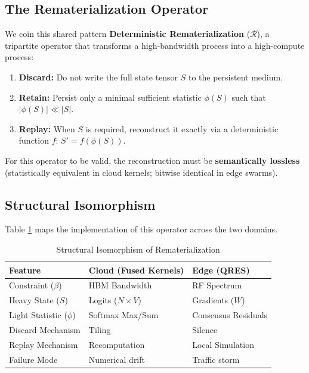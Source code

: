 \documentclass[conference]{IEEEtran}
\begin{document}
\subsection{The Rematerialization Operator}
We coin this shared pattern \textbf{Deterministic Rematerialization} ($\mathcal{R}$), a tripartite operator that transforms a high-bandwidth process into a high-compute process:
\begin{enumerate}
    \item \textbf{Discard:} Do not write the full state tensor $S$ to the persistent medium.
    \item \textbf{Retain:} Persist only a minimal sufficient statistic $\phi(S)$ such that $|\phi(S)| \ll |S|$.
    \item \textbf{Replay:} When $S$ is required, reconstruct it exactly via a deterministic function $f$: $S' = f(\phi(S))$.
\end{enumerate}

For this operator to be valid, the reconstruction must be \textbf{semantically lossless} (statistically equivalent in cloud kernels; bitwise identical in edge swarms).

\subsection{Structural Isomorphism}
Table \ref{tab:iso} maps the implementation of this operator across the two domains.

\begin{table}[htbp]
\caption{Structural Isomorphism of Rematerialization}
\begin{center}
\begin{tabular}{@{}lll@{}}
\toprule
\textbf{Feature} & \textbf{Cloud (Fused Kernels)} & \textbf{Edge (QRES)} \\ \midrule
Constraint ($\beta$) & HBM Bandwidth & RF Spectrum \\
Heavy State ($S$) & Logits ($N \times V$) & Gradients ($W$) \\
Light Statistic ($\phi$) & Softmax Max/Sum & Consensus Residuals \\
Discard Mechanism & Tiling & Silence \\
Replay Mechanism & Recomputation & Local Simulation \\
Failure Mode & Numerical drift & Traffic storm \\ \bottomrule
\end{tabular}
\label{tab:iso}
\end{center}
\end{table}
\end{document}
